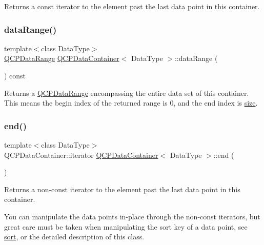Returns a const iterator to the element past the last data point in this container. \mbox{\label{class_q_c_p_data_container_aece90eeb2ba8d3c46d3d94023630fbc7}} 
\subsubsection{\texorpdfstring{data\+Range()}{dataRange()}}
{\footnotesize\ttfamily template$<$class Data\+Type$>$ \\
\hyperlink{class_q_c_p_data_range}{Q\+C\+P\+Data\+Range} \hyperlink{class_q_c_p_data_container}{Q\+C\+P\+Data\+Container}$<$ Data\+Type $>$\+::data\+Range (\begin{DoxyParamCaption}{ }\end{DoxyParamCaption}) const\hspace{0.3cm}{\ttfamily [inline]}}

Returns a \hyperlink{class_q_c_p_data_range}{Q\+C\+P\+Data\+Range} encompassing the entire data set of this container. This means the begin index of the returned range is 0, and the end index is \hyperlink{class_q_c_p_data_container_a8e9b262c739672e13472d0d45b720258}{size}. \mbox{\label{class_q_c_p_data_container_acf66dfad83fe041380f5e0491e7676f2}} 
\subsubsection{\texorpdfstring{end()}{end()}}
{\footnotesize\ttfamily template$<$class Data\+Type$>$ \\
Q\+C\+P\+Data\+Container\+::iterator \hyperlink{class_q_c_p_data_container}{Q\+C\+P\+Data\+Container}$<$ Data\+Type $>$\+::end (\begin{DoxyParamCaption}{ }\end{DoxyParamCaption})\hspace{0.3cm}{\ttfamily [inline]}}

Returns a non-\/const iterator to the element past the last data point in this container.

You can manipulate the data points in-\/place through the non-\/const iterators, but great care must be taken when manipulating the sort key of a data point, see \hyperlink{class_q_c_p_data_container_a75da92e33063b63d6da5014683591d45}{sort}, or the detailed description of this class. \mbox{\label{class_q_c_p_data_container_a2ad8a5399072d99a242d3a6d2d7e278a}} 
